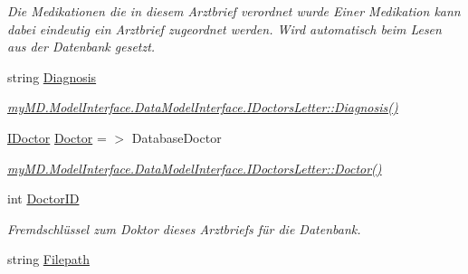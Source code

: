 \begin{CompactItemize}
\begin{CompactList}\small\item\em Die Medikationen die in diesem Arztbrief verordnet wurde Einer Medikation kann dabei eindeutig ein Arztbrief zugeordnet werden. Wird automatisch beim Lesen aus der Datenbank gesetzt. \item\end{CompactList}\item 
\hypertarget{classmy_m_d_1_1_model_1_1_data_model_1_1_doctors_letter_523223d6c6fe8798f0d70f376ffc99b8}{
string \hyperlink{classmy_m_d_1_1_model_1_1_data_model_1_1_doctors_letter_523223d6c6fe8798f0d70f376ffc99b8}{Diagnosis}}
\label{dc/d86/classmy_m_d_1_1_model_1_1_data_model_1_1_doctors_letter_523223d6c6fe8798f0d70f376ffc99b8}

\begin{CompactList}\small\item\em \hyperlink{interfacemy_m_d_1_1_model_interface_1_1_data_model_interface_1_1_i_doctors_letter_523223d6c6fe8798f0d70f376ffc99b8}{my\-MD.Model\-Interface.Data\-Model\-Interface.IDoctors\-Letter::Diagnosis()} \item\end{CompactList}\item 
\hypertarget{classmy_m_d_1_1_model_1_1_data_model_1_1_doctors_letter_cbb67c65f2abd1005d46939a7b3aff5f}{
\hyperlink{interfacemy_m_d_1_1_model_interface_1_1_data_model_interface_1_1_i_doctor}{IDoctor} \hyperlink{classmy_m_d_1_1_model_1_1_data_model_1_1_doctors_letter_cbb67c65f2abd1005d46939a7b3aff5f}{Doctor} = $>$ Database\-Doctor}
\label{dc/d86/classmy_m_d_1_1_model_1_1_data_model_1_1_doctors_letter_cbb67c65f2abd1005d46939a7b3aff5f}

\begin{CompactList}\small\item\em \hyperlink{interfacemy_m_d_1_1_model_interface_1_1_data_model_interface_1_1_i_doctors_letter_cbb67c65f2abd1005d46939a7b3aff5f}{my\-MD.Model\-Interface.Data\-Model\-Interface.IDoctors\-Letter::Doctor()} \item\end{CompactList}\item 
\hypertarget{classmy_m_d_1_1_model_1_1_data_model_1_1_doctors_letter_3ca9ada9ca35d9d0b3491f210f340322}{
int \hyperlink{classmy_m_d_1_1_model_1_1_data_model_1_1_doctors_letter_3ca9ada9ca35d9d0b3491f210f340322}{Doctor\-ID}}
\label{dc/d86/classmy_m_d_1_1_model_1_1_data_model_1_1_doctors_letter_3ca9ada9ca35d9d0b3491f210f340322}

\begin{CompactList}\small\item\em Fremdschl\"{u}ssel zum Doktor dieses Arztbriefs f\"{u}r die Datenbank. \item\end{CompactList}\item 
\hypertarget{classmy_m_d_1_1_model_1_1_data_model_1_1_doctors_letter_6e1da65a53ccced47cbd4c1d5b48e856}{
string \hyperlink{classmy_m_d_1_1_model_1_1_data_model_1_1_doctors_letter_6e1da65a53ccced47cbd4c1d5b48e856}{Filepath}}
\label{dc/d86/classmy_m_d_1_1_model_1_1_data_model_1_1_doctors_letter_6e1da65a53ccced47cbd4c1d5b48e856}


\end{CompactItemize}
